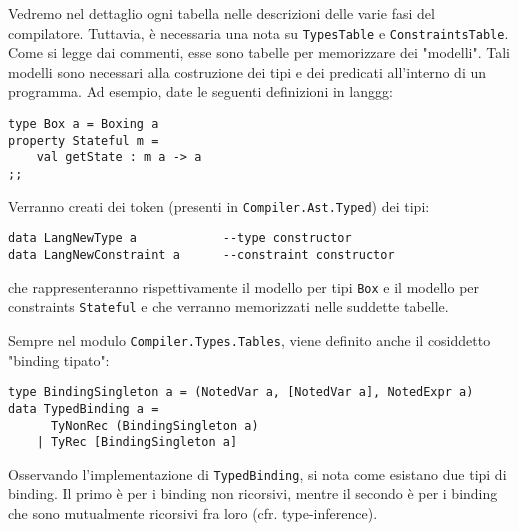\documentclass[10pt,a4paper]{article}
\begin{document}
Vedremo nel dettaglio ogni tabella nelle descrizioni delle varie fasi del compilatore. Tuttavia, è necessaria una nota
su \texttt{TypesTable} e \texttt{ConstraintsTable}. Come si legge dai commenti, esse sono tabelle per memorizzare dei
"modelli". Tali modelli sono necessari alla costruzione dei tipi e dei predicati all'interno di un programma. Ad esempio,
date le seguenti definizioni in langgg:
\begin{lstlisting}
type Box a = Boxing a
property Stateful m =
    val getState : m a -> a
;;
\end{lstlisting}
Verranno creati dei token (presenti in \texttt{Compiler.Ast.Typed}) dei tipi:
\begin{lstlisting}
data LangNewType a            --type constructor
data LangNewConstraint a      --constraint constructor
\end{lstlisting}
che rappresenteranno rispettivamente il modello per tipi \texttt{Box} e il modello per constraints \texttt{Stateful} e che
verranno memorizzati nelle suddette tabelle.

Sempre nel modulo \texttt{Compiler.Types.Tables}, viene definito anche il cosiddetto "binding tipato":
\begin{lstlisting}
type BindingSingleton a = (NotedVar a, [NotedVar a], NotedExpr a)
data TypedBinding a =
      TyNonRec (BindingSingleton a)
    | TyRec [BindingSingleton a]
\end{lstlisting}
Osservando l'implementazione di \texttt{TypedBinding}, si nota come esistano due tipi di binding. Il primo è per i binding
non ricorsivi, mentre il secondo è per i binding che sono mutualmente ricorsivi fra loro (cfr. type-inference).
\end{document}
